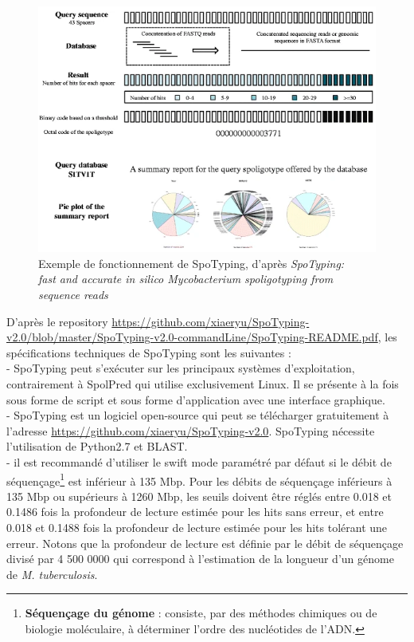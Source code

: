\documentclass[twoside,a4paper,11pt,frenchb,openany]{report}
\begin{document}
\begin{figure}[h!]
\centering
\includegraphics[scale=0.6]{spotyping.png}
\caption{Exemple de fonctionnement de SpoTyping, d'après \textit{SpoTyping:\\ fast and accurate in silico Mycobacterium spoligotyping from sequence reads}}
\end{figure}

D'après le repository \url{https://github.com/xiaeryu/SpoTyping-v2.0/blob/master/SpoTyping-v2.0-commandLine/SpoTyping-README.pdf}, les spécifications techniques de SpoTyping sont les suivantes :\\
- SpoTyping peut s'exécuter sur les principaux systèmes d'exploitation, contrairement à SpolPred qui utilise exclusivement Linux. Il se présente à la fois sous forme de script et sous forme d'application avec une interface graphique.\\
- SpoTyping est un logiciel open-source qui peut se télécharger gratuitement à l'adresse \url{https://github.com/xiaeryu/SpoTyping-v2.0}. SpoTyping nécessite l'utilisation de Python2.7 et BLAST.\\
- il est recommandé d'utiliser le swift mode paramétré par défaut si le débit de séquençage\footnote{\textbf{Séquençage du génome} : consiste, par des méthodes chimiques ou de biologie moléculaire, à déterminer l'ordre des nucléotides de l'ADN.} est inférieur à 135 Mbp. Pour les débits de séquençage inférieurs à 135 Mbp ou supérieurs à 1260 Mbp, les seuils doivent être réglés entre 0.018 et 0.1486 fois la profondeur de lecture estimée pour les hits sans erreur, et entre 0.018 et 0.1488 fois la profondeur de lecture estimée pour les hits tolérant une erreur. Notons que la profondeur de lecture est définie par le débit de séquençage divisé par 4 500 0000 qui correspond à l'estimation de la longueur d'un génome de \textit{M. tuberculosis}.
\end{document}
